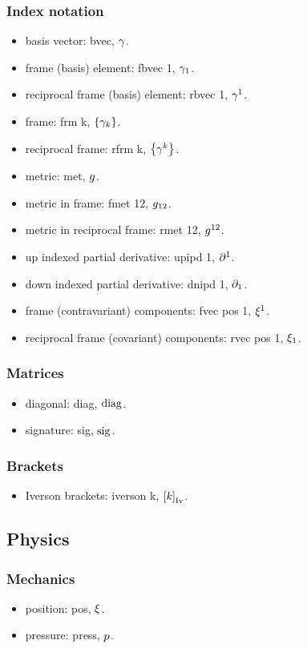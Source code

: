 \subsubsection{Index notation}
\begin{itemize}
\item basis vector: bvec, $\gamma$.
\item frame (basis) element: fbvec 1, $\gamma_{1}$.
\item reciprocal frame (basis) element: rbvec 1, $\gamma^{1}$.
\item frame: frm k, $\left\lbrace{\gamma_{k}}\right\rbrace$.
\item reciprocal frame: rfrm k, $\left\lbrace{\gamma^{k}}\right\rbrace$.
\item metric: met, $g$.
\item metric in frame: fmet 12, $g_{{1}{2}}$.
\item metric in reciprocal frame: rmet 12, $g^{{1}{2}}$.
\item up indexed partial derivative: upipd 1, $\partial^{1}$.
\item down indexed partial derivative: dnipd 1, $\partial_{1}$.
\item frame (contravariant) components: fvec pos 1, ${\xi}^{1}$.
\item reciprocal frame (covariant) components: rvec pos 1, ${\xi}_{1}$.
\end{itemize}


\subsubsection{Matrices}
\begin{itemize}
\item diagonal: diag, $\operatorname{diag}$.
\item signature: sig, $\operatorname{sig}$.
\end{itemize}


\subsubsection{Brackets}
\begin{itemize}
\item Iverson brackets: iverson k, $\left[{k}\right]_\text{Iv}$.
\end{itemize}


\subsection{Physics}


\subsubsection{Mechanics}
\begin{itemize}
\item position: pos, $\xi$.
\item pressure: press, $p$.
\end{itemize}



